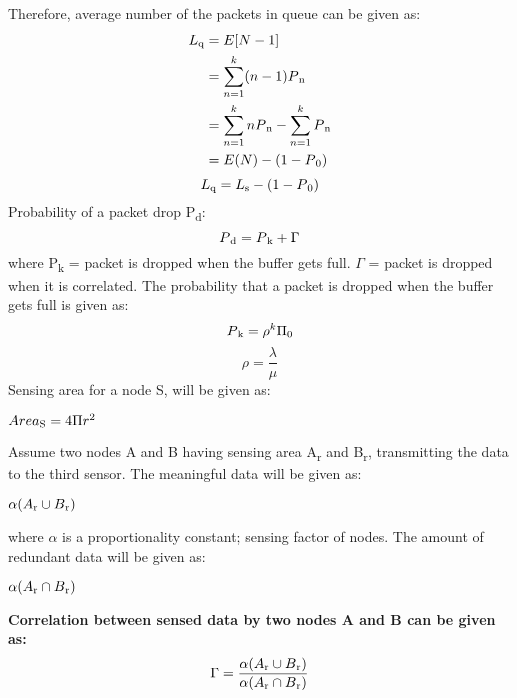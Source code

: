 Therefore, average number of the packets in queue can be given as:
\begin{equation}
\begin{split}
L \textsubscript{q} & = E [N-1] \\
 & = \sum_{n=1}^{k} (n-1) P \textsubscript{n} \\
 & = \sum_{n=1}^{k} n P \textsubscript{n} - \sum_{n=1}^{k} P \textsubscript{n} \\
 & = E(N)
 - (1- P \textsubscript{0}) \\ 
\end{split}
\end{equation}
\begin{equation}
    L \textsubscript{q} = L \textsubscript{s}-(1- P \textsubscript{0})
    \end{equation}
Probability of a packet drop P\textsubscript{d}:
\begin{equation}
    P\textsubscript{d}= P\textsubscript{k}+ \Gamma
\end{equation}
where 
\newline
P\textsubscript{k} = packet is dropped when the buffer gets full.
\newline
$\Gamma$ = packet is dropped when it is correlated.
\newline
The probability that a packet is dropped when the buffer gets full is given as:
\begin{equation}
    P\textsubscript{k} = \rho^k \Pi \textsubscript{0}
\end{equation}
\begin{equation}
\rho=\frac{\lambda}{\mu}
\end{equation}
Sensing area for a node S, will be given as:
\newline
\centerline{$Area \textsubscript{S} =4\Pi{r}^2$}
Assume two nodes A and B having sensing area A\textsubscript{r} and B\textsubscript{r}, transmitting the data to the third sensor. The meaningful data will be given as:
\newline
\centerline{$\alpha(A\textsubscript{r} \cup B\textsubscript{r})$} 
where $\alpha$ is a proportionality constant; sensing factor of nodes.
\newline
The amount of redundant data will be given as:
\newline
\centerline{$\alpha(A\textsubscript{r} \cap B\textsubscript{r})$} 
{\bf Correlation between sensed data by two nodes A and B can be given as: }
\begin{equation}
\Gamma= \frac{\alpha(A\textsubscript{r} \cup B\textsubscript{r})}{\alpha(A\textsubscript{r} \cap B\textsubscript{r})}
\end{equation}
